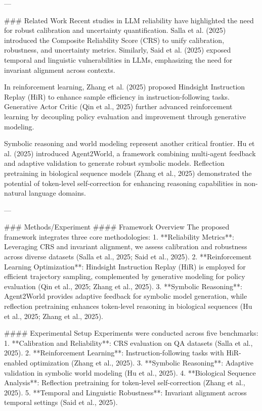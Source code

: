 ---

### Related Work
Recent studies in LLM reliability have highlighted the need for robust calibration and uncertainty quantification. Salla et al. (2025) introduced the Composite Reliability Score (CRS) to unify calibration, robustness, and uncertainty metrics. Similarly, Said et al. (2025) exposed temporal and linguistic vulnerabilities in LLMs, emphasizing the need for invariant alignment across contexts.

In reinforcement learning, Zhang et al. (2025) proposed Hindsight Instruction Replay (HiR) to enhance sample efficiency in instruction-following tasks. Generative Actor Critic (Qin et al., 2025) further advanced reinforcement learning by decoupling policy evaluation and improvement through generative modeling.

Symbolic reasoning and world modeling represent another critical frontier. Hu et al. (2025) introduced Agent2World, a framework combining multi-agent feedback and adaptive validation to generate robust symbolic models. Reflection pretraining in biological sequence models (Zhang et al., 2025) demonstrated the potential of token-level self-correction for enhancing reasoning capabilities in non-natural language domains.

---

### Methods/Experiment
#### Framework Overview
The proposed framework integrates three core methodologies:
1. **Reliability Metrics**: Leveraging CRS and invariant alignment, we assess calibration and robustness across diverse datasets (Salla et al., 2025; Said et al., 2025).
2. **Reinforcement Learning Optimization**: Hindsight Instruction Replay (HiR) is employed for efficient trajectory sampling, complemented by generative modeling for policy evaluation (Qin et al., 2025; Zhang et al., 2025).
3. **Symbolic Reasoning**: Agent2World provides adaptive feedback for symbolic model generation, while reflection pretraining enhances token-level reasoning in biological sequences (Hu et al., 2025; Zhang et al., 2025).

#### Experimental Setup
Experiments were conducted across five benchmarks:
1. **Calibration and Reliability**: CRS evaluation on QA datasets (Salla et al., 2025).
2. **Reinforcement Learning**: Instruction-following tasks with HiR-enabled optimization (Zhang et al., 2025).
3. **Symbolic Reasoning**: Adaptive validation in symbolic world modeling (Hu et al., 2025).
4. **Biological Sequence Analysis**: Reflection pretraining for token-level self-correction (Zhang et al., 2025).
5. **Temporal and Linguistic Robustness**: Invariant alignment across temporal settings (Said et al., 2025).

